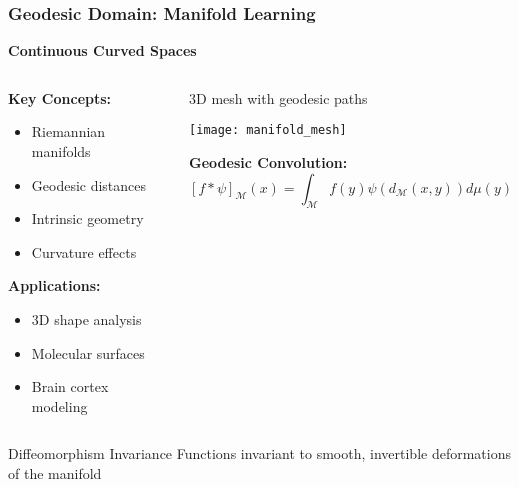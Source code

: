 \begin{frame}[fragile]\frametitle{Geodesic Domain: Manifold Learning}

\begin{center}
\textbf{Continuous Curved Spaces}
\end{center}

\begin{columns}
\begin{column}{0.4\textwidth}
\textbf{Key Concepts:}
\begin{itemize}
\item Riemannian manifolds
\item Geodesic distances
\item Intrinsic geometry
\item Curvature effects
\end{itemize}


\textbf{Applications:}
\begin{itemize}
\item 3D shape analysis
\item Molecular surfaces
\item Brain cortex modeling
\end{itemize}
\end{column}
\begin{column}{0.6\textwidth}
{\small 3D mesh with geodesic paths}

\begin{center}
\texttt{[image: manifold\_mesh]}
\end{center}

\textbf{Geodesic Convolution:}
$$[f * \psi]_{\mathcal{M}}(x) = \int_{\mathcal{M}} f(y) \psi(d_{\mathcal{M}}(x,y)) d\mu(y)$$

\end{column}
\end{columns}

\begin{block}{Diffeomorphism Invariance}
Functions invariant to smooth, invertible deformations of the manifold
\end{block}

\end{frame}

